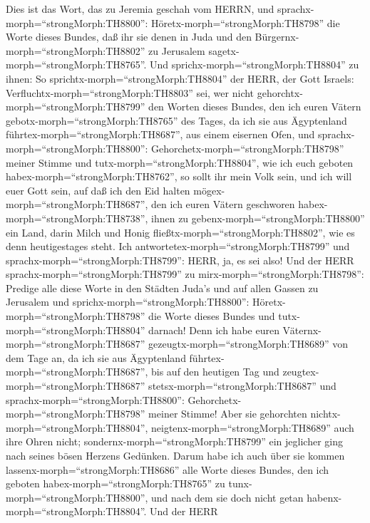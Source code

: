  Dies ist das Wort, das zu Jeremia geschah vom HERRN, und
sprachx-morph=``strongMorph:TH8800'': 
Höretx-morph=``strongMorph:TH8798'' die Worte dieses Bundes, daß ihr sie
denen in Juda und den Bürgernx-morph=``strongMorph:TH8802'' zu Jerusalem
sagetx-morph=``strongMorph:TH8765''.  Und
sprichx-morph=``strongMorph:TH8804'' zu ihnen: So
sprichtx-morph=``strongMorph:TH8804'' der HERR, der Gott Israels:
Verfluchtx-morph=``strongMorph:TH8803'' sei, wer nicht
gehorchtx-morph=``strongMorph:TH8799'' den Worten dieses Bundes,
 den ich euren Vätern gebotx-morph=``strongMorph:TH8765''
des Tages, da ich sie aus Ägyptenland
führtex-morph=``strongMorph:TH8687'', aus einem eisernen Ofen, und
sprachx-morph=``strongMorph:TH8800'':
Gehorchetx-morph=``strongMorph:TH8798'' meiner Stimme und
tutx-morph=``strongMorph:TH8804'', wie ich euch geboten
habex-morph=``strongMorph:TH8762'', so sollt ihr mein Volk sein, und ich
will euer Gott sein,  auf daß ich den Eid halten
mögex-morph=``strongMorph:TH8687'', den ich euren Vätern geschworen
habex-morph=``strongMorph:TH8738'', ihnen zu
gebenx-morph=``strongMorph:TH8800'' ein Land, darin Milch und Honig
fließtx-morph=``strongMorph:TH8802'', wie es denn heutigestages steht.
Ich antwortetex-morph=``strongMorph:TH8799'' und
sprachx-morph=``strongMorph:TH8799'': HERR, ja, es sei also!
 Und der HERR sprachx-morph=``strongMorph:TH8799'' zu
mirx-morph=``strongMorph:TH8798'': Predige alle diese Worte in den
Städten Juda's und auf allen Gassen zu Jerusalem und
sprichx-morph=``strongMorph:TH8800'':
Höretx-morph=``strongMorph:TH8798'' die Worte dieses Bundes und
tutx-morph=``strongMorph:TH8804'' darnach!  Denn ich habe
euren Väternx-morph=``strongMorph:TH8687''
gezeugtx-morph=``strongMorph:TH8689'' von dem Tage an, da ich sie aus
Ägyptenland führtex-morph=``strongMorph:TH8687'', bis auf den heutigen
Tag und zeugtex-morph=``strongMorph:TH8687''
stetsx-morph=``strongMorph:TH8687'' und
sprachx-morph=``strongMorph:TH8800'':
Gehorchetx-morph=``strongMorph:TH8798'' meiner Stimme!  Aber
sie gehorchten nichtx-morph=``strongMorph:TH8804'',
neigtenx-morph=``strongMorph:TH8689'' auch ihre Ohren nicht;
sondernx-morph=``strongMorph:TH8799'' ein jeglicher ging nach seines
bösen Herzens Gedünken. Darum habe ich auch über sie kommen
lassenx-morph=``strongMorph:TH8686'' alle Worte dieses Bundes, den ich
geboten habex-morph=``strongMorph:TH8765'' zu
tunx-morph=``strongMorph:TH8800'', und nach dem sie doch nicht getan
habenx-morph=``strongMorph:TH8804''.  Und der HERR
